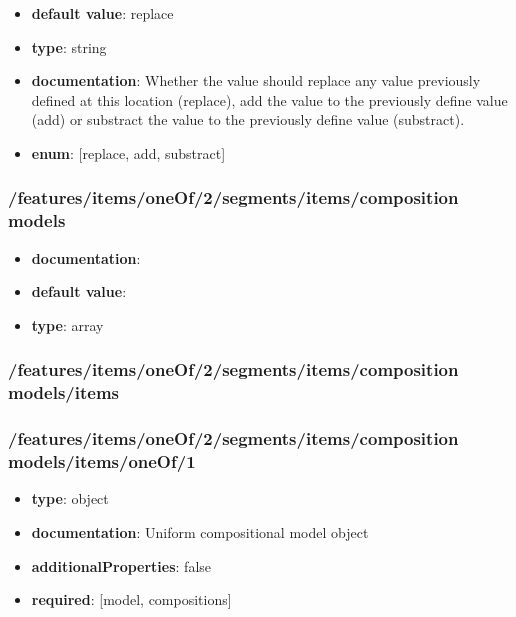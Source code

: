 \begin{itemize}\item {\bf default value}: replace
\item {\bf type}: string
\item {\bf documentation}: Whether the value should replace any value previously defined at this location (replace), add the value to the previously define value (add) or substract the value to the previously define value (substract).
\item {\bf enum}: [replace, add, substract]\end{itemize}\subsubsection{/features/items/oneOf/2/segments/items/composition models}
\begin{itemize}\item {\bf documentation}: 
\item {\bf default value}: 
\item {\bf type}: array
\end{itemize}\subsubsection{/features/items/oneOf/2/segments/items/composition models/items}

\subsubsection{/features/items/oneOf/2/segments/items/composition models/items/oneOf/1}
\begin{itemize}\item {\bf type}: object
\item {\bf documentation}: Uniform compositional model object
\item {\bf additionalProperties}: false
\item {\bf required}: [model, compositions]\end{itemize}
